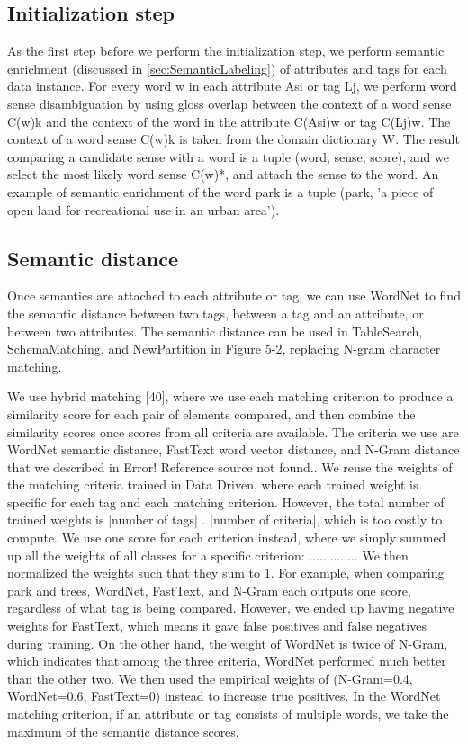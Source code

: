 \subsection{Initialization step}

As the first step before we perform the initialization step, we perform semantic enrichment (discussed in \autoref{sec:SemanticLabeling}) of attributes and tags for each data instance. For every word w in each attribute Asi or tag Lj, we perform word sense disambiguation by using gloss overlap between the context of a word sense C(w)k and the context of the word in the attribute C(Asi)w or tag C(Lj)w. The context of a word sense C(w)k is taken from the domain dictionary W. The result comparing a candidate sense with a word is a tuple (word, sense, score), and we select the most likely word sense C(w)*, and attach the sense to the word. An example of semantic enrichment of the word park is a tuple (park, 'a piece of open land for recreational use in an urban area').

\subsection{Semantic distance}

Once semantics are attached to each attribute or tag, we can use WordNet to find the semantic distance between two tags, between a tag and an attribute, or between two attributes. The semantic distance can be used in TableSearch, SchemaMatching, and NewPartition in Figure 5-2, replacing N-gram character matching.

We use hybrid matching \cite{Rahm2001Survey}[40], where we use each matching criterion to produce a similarity score for each pair of elements compared, and then combine the similarity scores once scores from all criteria are available. The criteria we use are WordNet semantic distance, FastText word vector distance, and N-Gram distance that we described in Error! Reference source not found.. We reuse the weights of the matching criteria trained in Data Driven, where each trained weight is specific for each tag and each matching criterion. However, the total number of trained weights is |number of tags| . |number of criteria|, which is too costly to compute. We use one score for each criterion instead, where we simply summed up all the weights of all classes for a specific criterion: ..............
We then normalized the weights such that they sum to 1. For example, when comparing park and trees, WordNet, FastText, and N-Gram each outputs one score, regardless of what tag is being compared. However, we ended up having negative weights for FastText, which means it gave false positives and false negatives during training. On the other hand, the weight of WordNet is twice of N-Gram, which indicates that among the three criteria, WordNet performed much better than the other two. We then used the empirical weights of (N-Gram=0.4, WordNet=0.6, FastText=0) instead to increase true positives. In the WordNet matching criterion, if an attribute or tag consists of multiple words, we take the maximum of the semantic distance scores.

